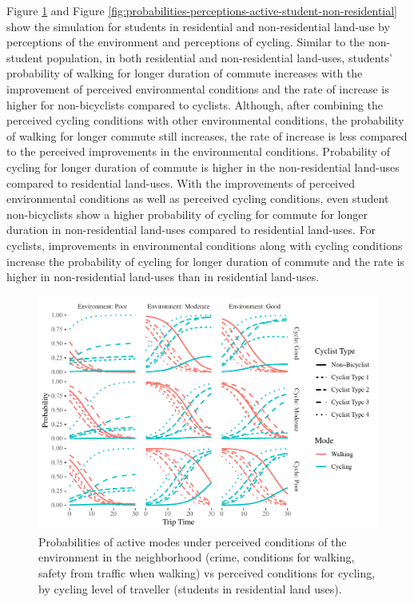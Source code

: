 \documentclass[]{elsarticle} %
\makeatletter
\def\maxwidth{\ifdim\Gin@nat@width>\linewidth\linewidth
\else\Gin@nat@width\fi}
\let\Oldincludegraphics\includegraphics
\renewcommand{\includegraphics}[1]{\Oldincludegraphics[width=\maxwidth]{#1}}
\makeatother
\begin{document}
Figure \ref{fig:probabilities-perceptions-active-student-residential}
and Figure
\ref{fig:probabilities-perceptions-active-student-non-residential} show
the simulation for students in residential and non-residential land-use
by perceptions of the environment and perceptions of cycling. Similar to
the non-student population, in both residential and non-residential
land-uses, students' probability of walking for longer duration of
commute increases with the improvement of perceived environmental
conditions and the rate of increase is higher for non-bicyclists
compared to cyclists. Although, after combining the perceived cycling
conditions with other environmental conditions, the probability of
walking for longer commute still increases, the rate of increase is less
compared to the perceived improvements in the environmental conditions.
Probability of cycling for longer duration of commute is higher in the
non-residential land-uses compared to residential land-uses. With the
improvements of perceived environmental conditions as well as perceived
cycling conditions, even student non-bicyclists show a higher
probability of cycling for commute for longer duration in
non-residential land-uses compared to residential land-uses. For
cyclists, improvements in environmental conditions along with cycling
conditions increase the probability of cycling for longer duration of
commute and the rate is higher in non-residential land-uses than in
residential land-uses.

\begin{figure}
\centering
\includegraphics{Active-Travel-in-Bangladesh_files/figure-latex/figure-probabilities-perceptions-active-student-residential-1.pdf}
\caption{\label{fig:probabilities-perceptions-active-student-residential}Probabilities
of active modes under perceived conditions of the environment in the
neighborhood (crime, conditions for walking, safety from traffic when
walking) vs perceived conditions for cycling, by cycling level of
traveller (students in residential land uses).}
\end{figure}
\end{document}

